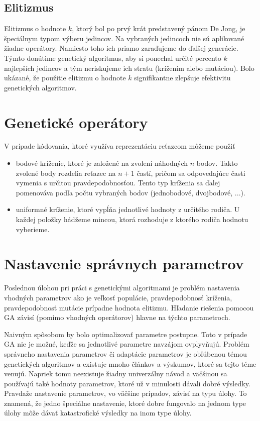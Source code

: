 \subsection{Elitizmus}\label{kap2:2.4:2.4.3:Elitism}
Elitizmus o hodnote $k$, ktorý bol po prvý krát predstavený pánom De Jong, je špeciálnym typom výberu jedincov. Na vybraných jedincoch nie sú aplikované žiadne operátory. Namiesto toho ich priamo zaraďujeme do ďalšej generácie. Týmto donútime genetický algoritmus, aby si ponechal určité percento $k$ najlepších jedincov a tým neriskujeme ich stratu (krížením alebo mutáciou). Bolo ukázané, že použitie elitizmu o hodnote $k$ signifikantne zlepšuje efektivitu genetických algoritmov.

\section{Genetické operátory}\label{kap2:2.5:Operators}
V prípade kódovania, ktoré využíva reprezentáciu reťazcom môžeme použiť
\begin{itemize}
\item bodové kríženie, ktoré je založené na zvolení náhodných $n$ bodov. Takto zvolené body rozdelia reťazec na $n+1$ častí, pričom sa odpovedajúce časti vymenia s určitou pravdepodobnosťou. Tento typ kríženia sa ďalej pomenováva podľa počtu vybraných bodov (jednobodové, dvojbodové, ...).
\item uniformné kríženie, ktoré vypĺňa jednotlivé hodnoty z určitého rodiča. U každej položky hádžeme mincou, ktorá rozhoduje z ktorého rodiča hodnotu vyberieme.
\end{itemize}

\section{Nastavenie správnych parametrov}\label{kap2:2.6:Parameters}
Poslednou úlohou pri práci s genetickými algoritmami je problém nastavenia vhodných parametrov ako je veľkosť populácie, pravdepodobnosť kríženia, pravdepodobnosť mutácie prípadne hodnota elitizmu. Hľadanie riešenia pomocou GA závisí (pomimo vhodných operátorov) hlavne na týchto parametroch.

Naivným spôsobom by bolo optimalizovať parametre postupne. Toto v prípade GA nie je možné, keďže sa jednotlivé parametre navzájom ovplyvňujú. Problém správneho nastavenia parametrov či adaptácie parametrov je obľúbenou témou genetických algoritmov a existuje mnoho článkov a výskumov, ktoré sa tejto téme venujú. Napriek tomu neexistuje žiadny univerzálny návod a väčšinou sa používajú také hodnoty parametrov, ktoré už v minulosti dávali dobré výsledky. Pravdaže nastavenie parametrov, vo väčšine prípadov, závisí na typu úlohy. To znamená, že jedno špeciálne nastavenie, ktoré dobre fungovalo na jednom type úlohy môže dávať katastrofické výsledky na inom type úlohy.

